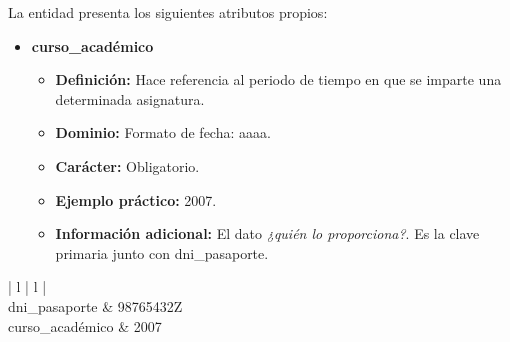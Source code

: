 \begin{description}
   \item[Descripción de los atributos propios] La entidad presenta los
   siguientes atributos propios:

   \begin{itemize}
   \item \textbf{curso\_académico}
      \begin{itemize}
         \item \textbf{Definición:} Hace referencia al periodo de tiempo en que se imparte una determinada asignatura.
         \item \textbf{Dominio:} Formato de fecha: aaaa.
         \item \textbf{Carácter:}  Obligatorio.
         \item \textbf{Ejemplo práctico:} 2007.
         \item \textbf{Información adicional:} El dato \textit{¿quién lo proporciona?}. Es la clave primaria junto con dni\_pasaporte.
      \end{itemize}
   \end{itemize}

   \item[Ejemplo práctico]

   \item \begin{center}
            \begin{tabular}{ | l | l | }
            \hline
             \\
            \hline
            dni\_pasaporte & 98765432Z \\
            \hline
            curso\_académico & 2007\\
            \hline
            \end{tabular}
         \end{center}
   \end{description}
